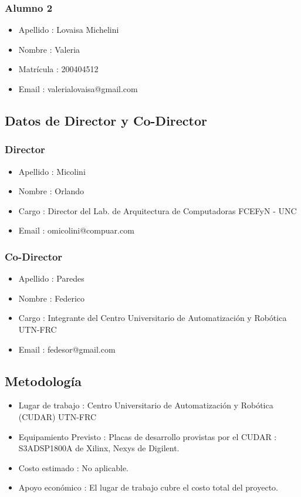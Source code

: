 \documentclass[a4paper,12pt]{article}
\begin{document}
\subsubsection{Alumno 2}
\begin{itemize}
  \item Apellido : Lovaisa Michelini
  \item Nombre : Valeria
  \item Matrícula : 200404512
  \item Email : valerialovaisa@gmail.com
\end{itemize} 

\subsection{Datos de Director y Co-Director}
\subsubsection{Director}
\begin{itemize}
  \item Apellido : Micolini
  \item Nombre : Orlando
  \item Cargo : Director del Lab. de Arquitectura de Computadoras FCEFyN - UNC
  \item Email : omicolini@compuar.com
\end{itemize} 
\subsubsection{Co-Director}
\begin{itemize}
  \item Apellido : Paredes
  \item Nombre : Federico
  \item Cargo : Integrante del Centro Universitario de Automatización y Robótica UTN-FRC
  \item Email : fedesor@gmail.com
\end{itemize} 

\subsection{Metodología}
\begin{itemize}
  	\item Lugar de trabajo : Centro Universitario de Automatización y Robótica (CUDAR) UTN-FRC
	\item Equipamiento Previsto : Placas de desarrollo provistas por el CUDAR :  S3ADSP1800A de Xilinx, Nexys de Digilent.
	\item Costo estimado : No aplicable.
	\item Apoyo económico : El lugar de trabajo cubre el costo total del proyecto.
\end{itemize} 
\end{document}
